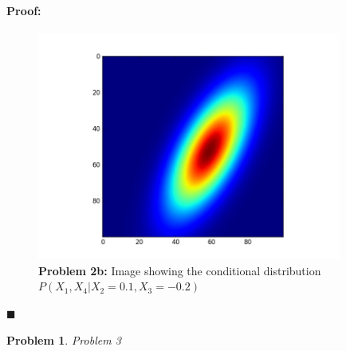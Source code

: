 \documentclass[12pt]{article}
\newenvironment{proof}{\paragraph{Proof: }}{\hfill$\blacksquare$}
\newtheorem{problem}{Problem}%
\begin{document}
\begin{proof}
\begin{enumerate}
\begin{figure}[!htbp]
\centering
\includegraphics[width=10cm]{hw2_p2_conditional.jpg}
\caption{\textbf{Problem 2b:} Image showing the conditional distribution $P(X_1,X_4|X_2 = 0.1,X_3 = -0.2)$}
\end{figure}

\end{enumerate}
\end{proof}

\begin{problem}
\normalfont
Problem 3
\end{problem}
\end{document}

